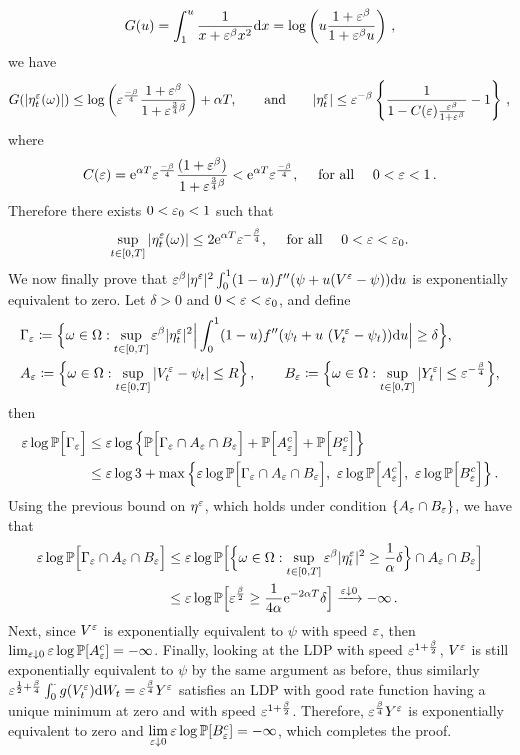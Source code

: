 $$
G(u) = \int_1^u\frac{1}{x + \varepsilon^\beta x^2}\mathrm{d} x = \log\left(u\frac{1+\varepsilon^\beta}{1 + \varepsilon^\beta u}\right)\,,
$$
we have
$$
G(|\eta_{t}^\varepsilon(\omega)|) 
\leq \log\left(\varepsilon^{\frac{-\beta}{4}}\frac{1+\varepsilon^\beta}{1 + \varepsilon^{\frac{3}{4}\beta}}\right) + \alpha T,
\qquad\text{and}\qquad
|\eta_{t}^\varepsilon| \leq \varepsilon^{-\beta}\left\{\frac{1}{1 - C(\varepsilon)\frac{\varepsilon^\beta}{1 + \varepsilon^\beta}} - 1 \right\}\,,
$$
where 
$$
C(\varepsilon) = \mathrm{e}^{\alpha T}\varepsilon^{\frac{-\beta}{4}}\frac{(1+\varepsilon^\beta)}{1 + \varepsilon^{\frac{3}{4}\beta}}
 <\mathrm{e}^{\alpha T}\varepsilon^{\frac{-\beta}{4}}, 
\quad \text{ for all } \quad 0<\varepsilon<1\,.
$$
Therefore there exists $0<\varepsilon_0<1$ such that
\[
\sup_{t \in [0,T]}|\eta_{t}^\varepsilon(\omega)|\leq 2\mathrm{e}^{\alpha T}\varepsilon^{-\frac{\beta}{4}},
\quad \text{ for all } \quad 0 < \varepsilon <\varepsilon_0.
\]
We now finally prove that $\varepsilon^\beta |\eta^\varepsilon|^2 \int_0^1 (1-u)f''(\psi + u (V^\varepsilon - \psi))\mathrm{d} u$ is exponentially equivalent to zero.
Let $\delta >0$ and $0<\varepsilon<\varepsilon_0$, and define
\begin{align*}
&\Gamma_\eps \defEqual \Big\{\omega\in\Omega : \sup_{t \in [0,T]}\eps^\beta |\eta_{t}^\eps|^2 \Big|\int_0^1 (1-u)f''(\psi_t + u\ (V^{\eps}_{t} - \psi_t))\D u\Big|\geq \delta\Big\}, \\
&A_\eps \defEqual \Big\{\omega\in\Omega : \sup_{t \in [0,T]}|V^\eps_t - \psi_t|\leq  R \Big\}\,,
\qquad
B_\eps \defEqual \Big\{\omega\in\Omega : \sup_{t\in[0,T]}|Y_t^\eps|\leq \eps^{-\frac{\beta}{4}}\Big\},
\end{align*}
then
\begin{align*}
\varepsilon\log\mathbb{P}\Big[\Gamma_\varepsilon\Big]
&\leq \varepsilon\log \Big\{ \mathbb{P}\Big[\Gamma_\varepsilon \cap A_\varepsilon \cap B_\varepsilon\Big] + \mathbb{P}\Big[A_\varepsilon^c \Big] + \mathbb{P}\Big[B_\varepsilon^c   \Big]\Big\} \\
&\leq \varepsilon\log3 + \max \Big \{ \varepsilon\log \mathbb{P}\Big[\Gamma_\varepsilon \cap A_\varepsilon \cap B_\varepsilon\Big], \  \varepsilon\log \mathbb{P}\Big[A_\varepsilon^c \Big], \  \varepsilon\log \mathbb{P}\Big[B_\varepsilon^c \Big] \Big\}\,.
\end{align*}
Using the previous bound on $\eta^\varepsilon$, which holds under condition $\{A_\varepsilon\cap B_\varepsilon\}$, we have that
\begin{align*}
\varepsilon\log \mathbb{P}\Big[\Gamma_\varepsilon \cap A_\varepsilon \cap B_\varepsilon\Big]
&\leq \varepsilon\log \mathbb{P}\Big[\Big\{\omega\in\Omega : \sup_{t \in [0,T]}\varepsilon^\beta |\eta_{t}^\varepsilon|^2\geq \frac{1}{\alpha}\delta\Big\} \cap A_\varepsilon \cap B_\varepsilon\Big] \\
&\leq \varepsilon\log \mathbb{P}\Big[\varepsilon^{\frac{\beta}{2}}\geq \frac{1}{4\alpha}\mathrm{e}^{-2\alpha T}\delta \Big]
\xrightarrow{\varepsilon \downarrow 0}-\infty\,.
\end{align*}
Next, since $V^\varepsilon$ is exponentially equivalent to $\psi$ with speed $\varepsilon$, then ${\lim_{\varepsilon\downarrow 0}\varepsilon\log \mathbb{P}[A_\varepsilon^c] = -\infty}$. Finally, looking at the LDP with speed $\varepsilon^{1 + \frac{\beta}{2}}$, $V^\varepsilon$ is still exponentially equivalent to $\psi$ by the same argument as before, thus similarly $\varepsilon^{\frac{1}{2} + \frac{\beta}{4}}\int_0^\cdot g(V^\varepsilon_t)\mathrm{d} W_t = \varepsilon^{\frac{\beta}{4}}Y^\varepsilon$ satisfies an LDP with good rate function having a unique minimum at zero and with speed $\varepsilon^{1 + \frac{\beta}{2}}$. Therefore, $\varepsilon^{\frac{\beta}{4}}Y^\varepsilon$ is exponentially equivalent to zero and
$\lim\limits_{\varepsilon\downarrow 0}\varepsilon \log \mathbb{P}[B_\varepsilon^c] = -\infty$, which completes the proof.

